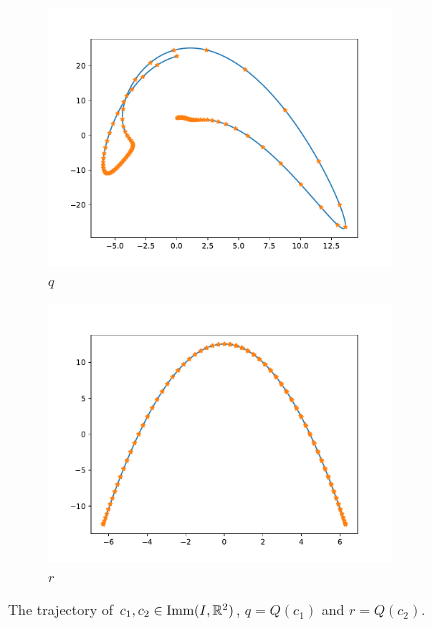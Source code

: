 \begin{figure}[t]
\begin{subfigure}[t]{0.5\textwidth}
        \centering
        \includegraphics[width=\linewidth]{figures/curve_1/curve_q.pdf}
        \caption{\(q\)}
    \end{subfigure}
    \begin{subfigure}[t]{0.5\textwidth}\label{fig:curve_r}
        \centering
        \includegraphics[width=\linewidth]{figures/curve_1/curve_r.pdf}
        \caption{\(r\)}
    \end{subfigure}
    \caption{The trajectory of \(c_1, c_2 \in \text{Imm}(I, \mathbb{R}^2)\), \(q = Q(c_1)\) and \(r = Q(c_2)\).}
\end{figure}

